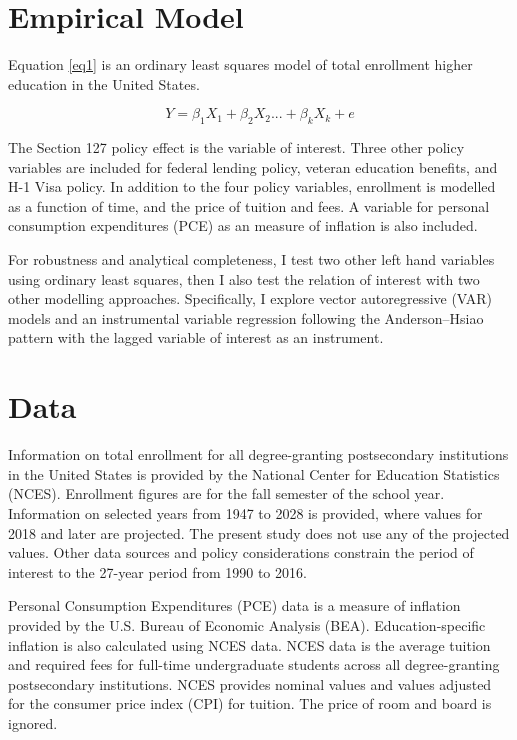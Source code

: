\documentclass[review]{elsarticle}
\begin{document}
    \section{Empirical Model}

    Equation \ref{eq1} is an ordinary least squares model of total enrollment higher education in the United States.

    \begin{equation}
        Y = \beta_1X_1+\beta_2X_2...+\beta_kX_k+e
        \label{eq1}
    \end{equation}

    The Section 127 policy effect is the variable of interest.
    Three other policy variables are included for federal lending policy, veteran education benefits, and H-1 Visa policy.
    In addition to the four policy variables, 
    enrollment is modelled as a function of time,
    and the price of tuition and fees.
    A variable for personal consumption expenditures (PCE) as an measure of inflation is also included.

    For robustness and analytical completeness, I test two other left hand variables using ordinary least squares,
    then I also test the relation of interest with two other modelling approaches.
    Specifically, I explore vector autoregressive (VAR) models
    and an instrumental variable regression following the Anderson–Hsiao pattern\cite{anderson1981estimation} with the lagged variable of interest as an instrument.

    \section{Data}

    Information on total enrollment for all degree-granting postsecondary institutions in the United States
    is provided by the National Center for Education Statistics (NCES)\cite{nces_2019}.
    Enrollment figures are for the fall semester of the school year.
    Information on selected years from 1947 to 2028 is provided, where values for 2018 and later are projected.
    The present study does not use any of the projected values.
    Other data sources and policy considerations constrain the period of interest to the 27-year period from 1990 to 2016.    

    Personal Consumption Expenditures (PCE) data is a measure of inflation provided by the U.S. Bureau of Economic Analysis (BEA)\cite{bea_2020}.
    Education-specific inflation is also calculated using NCES data\cite{nces_2017}.
    NCES data is the average tuition and required fees for full-time undergraduate students across all degree-granting postsecondary institutions.
    NCES provides nominal values and values adjusted for the consumer price index (CPI) for tuition.
    The price of room and board is ignored.
\end{document}
